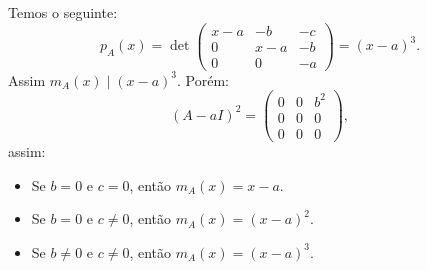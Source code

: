 \documentclass[11pt,a4paper]{article}
\begin{document}
{{\[\]
Temos o seguinte:
\[
p_A(x)=\det\begin{pmatrix}
x-a & -b & -c \\ 0 & x-a & -b \\ 0 & 0 & -a
\end{pmatrix}=(x-a)^3.
\]
Assim $m_A(x)\mid(x-a)^3$. Porém:
\[
(A-aI)^2=\begin{pmatrix}
0 & 0 & b^2 \\ 0 & 0 & 0 \\ 0 & 0 & 0
\end{pmatrix},
\]
assim:
\begin{itemize}
\item Se $b=0$ e $c=0$, então $m_A(x)=x-a$.
\item Se $b=0$ e $c\neq 0$, então $m_A(x)=(x-a)^2$.
\item Se $b\neq 0$ e $c\neq 0$, então $m_A(x)=(x-a)^3$.
\end{itemize}
}
}
\end{document}
